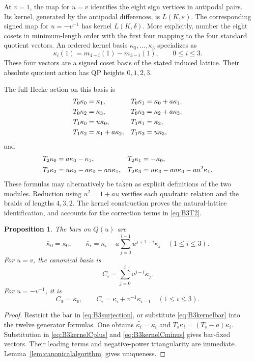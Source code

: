 \documentclass[11pt]{article}
\numberwithin{equation}{section}
\newtheorem{proposition}[theorem]{Proposition}
\theoremstyle{definition}
\newcommand{\ee}{\varepsilon}
\newcommand{\dd}{\delta}
\begin{document}
At \(v=1\), the map for \(u=v\) identifies the eight sign vertices in antipodal pairs.
Its kernel, generated by the antipodal differences, is \(L(K,\ee)\).
The corresponding signed map for \(u=-v^{-1}\) has kernel \(L(K,\dd)\).
More explicitly, number the eight cosets in minimum-length order with the first four mapping to the four standard quotient vectors.
An ordered kernel basis \(\kappa_0,\ldots,\kappa_3\) specializes as
\[
 \kappa_i(1)=m_{4+i}(1)-m_{3-i}(1),\qquad 0\leq i\leq3 .
\]
These four vectors are a signed coset basis of the stated induced lattice.
Their absolute quotient action has QP heights \(0,1,2,3\).

The full Hecke action on this basis is
\begin{align}
 T_0\kappa_0&=\kappa_1,&
 T_0\kappa_1&=\kappa_0+a\kappa_1,\notag\\
 T_0\kappa_2&=\kappa_3,&
 T_0\kappa_3&=\kappa_2+a\kappa_3,\label{eq:B3T0}\\
 T_1\kappa_0&=u\kappa_0,&
 T_1\kappa_1&=\kappa_2,\notag\\
 T_1\kappa_2&=\kappa_1+a\kappa_2,&
 T_1\kappa_3&=u\kappa_3,\label{eq:B3T1}
\end{align}
and
\begin{align}
 T_2\kappa_0&=a\kappa_0-\kappa_1,&
 T_2\kappa_1&=-\kappa_0,\notag\\
 T_2\kappa_2&=u\kappa_2-a\kappa_0-au\kappa_1,&
 T_2\kappa_3&=u\kappa_3-au\kappa_0-au^2\kappa_1 .
 \label{eq:B3T2}
\end{align}
These formulas may alternatively be taken as explicit definitions of the two modules.
Reduction using \(u^2=1+au\) verifies each quadratic relation and the braids of lengths \(4,3,2\).
The kernel construction proves the natural-lattice identification, and accounts for the correction terms in \eqref{eq:B3T2}.

\begin{proposition}\label{prop:B3kernelcanonical}
The bars on \(Q(u)\) are
\begin{equation}
 \bar\kappa_0=\kappa_0,\qquad
 \bar\kappa_i=\kappa_i-a\sum_{j=0}^{i-1}u^{j+1-i}\kappa_j
 \quad(1\leq i\leq3).
 \label{eq:B3kernelbar}
\end{equation}
For \(u=v\), the canonical basis is
\begin{equation}
 C_i=\sum_{j=0}^i v^{j-i}\kappa_j .
 \label{eq:B3kernelCplus}
\end{equation}
For \(u=-v^{-1}\), it is
\begin{equation}
 C_0=\kappa_0,\qquad C_i=\kappa_i+v^{-1}\kappa_{i-1}\quad(1\leq i\leq3).
 \label{eq:B3kernelCminus}
\end{equation}
\end{proposition}
\begin{proof}
Restrict the bar in \eqref{eq:B3surjection}, or substitute \eqref{eq:B3kernelbar} into the twelve generator formulas.
One obtains \(\bar{\bar\kappa_i}=\kappa_i\) and
\(\overline{T_s\kappa_i}=(T_s-a)\bar\kappa_i\).
Substitution in \eqref{eq:B3kernelCplus} and \eqref{eq:B3kernelCminus} gives bar-fixed vectors.
Their leading terms and negative-power triangularity are immediate.
Lemma~\ref{lem:canonicalalgorithm} gives uniqueness.
\end{proof}
\end{document}
